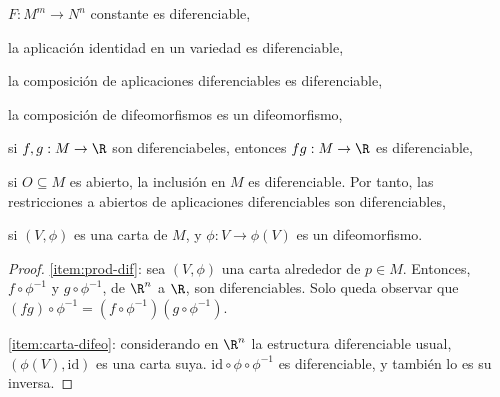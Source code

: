 \begin{nprop} \label{prop:propiedades-dif}
  \hfill
  \begin{nlist}
  \item
    $F:M^{m}\to N^{n}$ constante es diferenciable,
  \item
    la aplicación identidad en un variedad es diferenciable,
  \item
    la composición de aplicaciones diferenciables es diferenciable,
  \item
    la composición de difeomorfismos es un difeomorfismo,
  \item \label{item:prod-dif}
    si $f,g: M\to\R$ son diferenciabeles, entonces $fg: M\to\R$ es
    diferenciable,
  \item
    si $O\subseteq M$ es abierto, la inclusión en $M$ es diferenciable. Por
    tanto, las restricciones a abiertos de aplicaciones diferenciables son
    diferenciables,
  \item \label{item:carta-difeo}
    si $(V,\phi)$ es una carta de $M$, y $\phi: V\to \phi(V)$ es un difeomorfismo.
  \end{nlist}
\end{nprop}
\begin{proof}
  \ref{item:prod-dif}: sea $(V,\phi)$ una carta alrededor de $p\in M$. Entonces,
  $f\circ \phi^{-1}$ y $g\circ \phi^{-1}$, de $\R^{n}$ a $\R$, son
  diferenciables. Solo queda observar que
  $(fg)\circ\phi^{-1} = (f\circ\phi^{-1})(g\circ\phi^{-1})$.
  
  \ref{item:carta-difeo}: considerando en $\R^{n}$ la estructura diferenciable
  usual, $(\phi(V),\mathrm{id})$ es una carta suya. $\mathrm{id}\circ
  \phi\circ\phi^{-1}$ es diferenciable, y también lo es su inversa.
\end{proof}

